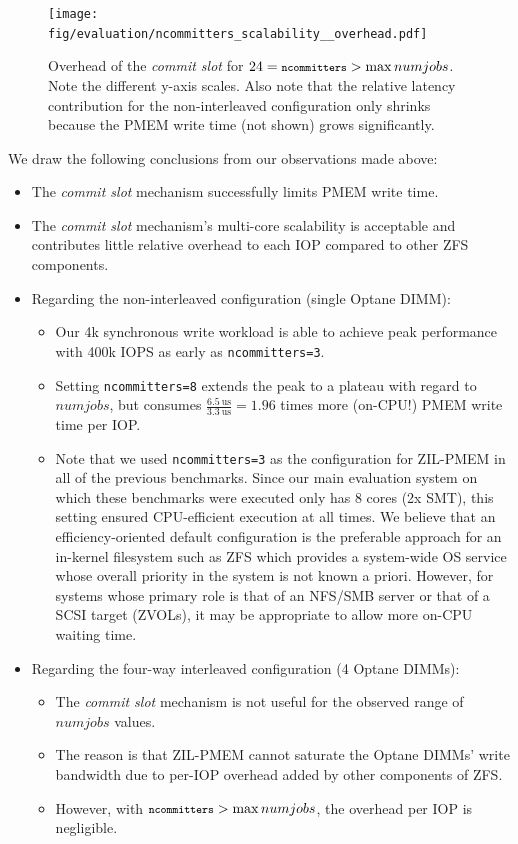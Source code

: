 \documentclass[12pt,a4paper,twoside]{book}
\begin{document}
\begin{figure}[H]
    \centering
    \texttt{[image: fig/evaluation/ncommitters\_scalability\_\_overhead.pdf]}
    \caption{
        Overhead of the \textit{commit slot} for $24 = {\texttt{\footnotesize ncommitters}} > \max numjobs$.
        Note the different y-axis scales.
        Also note that the relative latency contribution for the non-interleaved configuration only shrinks because the PMEM write time (not shown) grows significantly.}
    \label{fig:eval:ncommitters_scalability:overhead}
\end{figure}


We draw the following conclusions from our observations made above:
\begin{itemize}[noitemsep]
    \item The \textit{commit slot} mechanism successfully limits PMEM write time.
    \item The \textit{commit slot} mechanism's multi-core scalability is acceptable and contributes little relative overhead to each IOP compared to other ZFS components.
    \item Regarding the non-interleaved configuration (single Optane DIMM):
        \begin{itemize}
            \item Our 4k synchronous write workload is able to achieve peak performance with 400k IOPS as early as \lstinline{ncommitters=3}.
            \item Setting \lstinline{ncommitters=8} extends the peak to a plateau with regard to $numjobs$, but consumes $\frac{6.5~\text{us}}{3.3~\text{us}} = 1.96$ times more (on-CPU!) PMEM write time per IOP.
            \item Note that we used \lstinline{ncommitters=3} as the configuration for ZIL-PMEM in all of the previous benchmarks.
                Since our main evaluation system on which these benchmarks were executed only has 8 cores (2x SMT), this setting ensured CPU-efficient execution at all times.
                We believe that an efficiency-oriented default configuration is the preferable approach for an in-kernel filesystem such as ZFS which provides a system-wide OS service whose overall priority in the system is not known a priori.
                However, for systems whose primary role is that of an NFS/SMB server or that of a SCSI target (ZVOLs), it may be appropriate to allow more on-CPU waiting time.
        \end{itemize}
    \item Regarding the four-way interleaved configuration (4 Optane DIMMs):
        \begin{itemize}
            \item The \textit{commit slot} mechanism is not useful for the observed range of $numjobs$ values.
            \item The reason is that ZIL-PMEM cannot saturate the Optane DIMMs' write bandwidth due to per-IOP overhead added by other components of ZFS.
            \item However, with ${\texttt{\footnotesize ncommitters}} > \max numjobs$, the overhead per IOP is negligible.
        \end{itemize}
\end{itemize}
\end{document}
